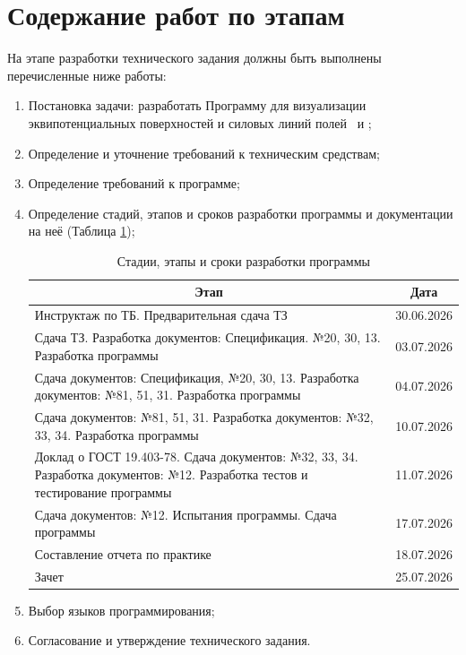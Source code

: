 \documentclass[14pt,a4paper,final]{extreport}
\begin{document}
\section{Содержание работ по этапам}
На этапе разработки технического задания должны быть выполнены перечисленные ниже
работы:
\begin{enumerate}[label=\asbuk*),ref=\asbuk*]
	\item Постановка задачи: разработать Программу для визуализации эквипотенциальных поверхностей и силовых линий полей \fieldA\ и \fieldB; 
	\item Определение и уточнение требований к техническим средствам;
	\item Определение требований к программе;
	\item Определение стадий, этапов и сроков разработки программы и документации на неё (Таблица \ref{table:stages});
	\begin{table}[h!]
	\centering
	\begin{tabular}{|p{10cm}|c|} 
		\hline
		\multicolumn{1}{|c|}{Этап} & \multicolumn{1}{c|}{Дата} \\ [0.5ex]
		\hline
		Инструктаж по ТБ. Предварительная сдача ТЗ &
		30.06.2026
	
		\\ \hline
		Сдача ТЗ. Разработка документов: Спецификация. №20, 30, 13. Разработка программы &
		03.07.2026
		
		\\ \hline
		Сдача документов: Спецификация, №20, 30, 13. Разработка документов: №81, 51, 31. Разработка программы &
		04.07.2026
		\\ \hline
		Сдача документов: №81, 51, 31. Разработка документов: №32, 33, 34. Разработка программы &
		10.07.2026

		\\ \hline
		Доклад о ГОСТ 19.403-78. Сдача документов: №32, 33, 34. Разработка документов: №12. Разработка тестов и тестирование программы &
		11.07.2026

		\\ \hline
		Сдача документов: №12. Испытания программы. Сдача программы &
		17.07.2026
		\\ \hline
		Составление отчета по практике &
		18.07.2026

		\\ \hline
		Зачет &
		25.07.2026
		
		\\ [1ex] 
		\hline
	\end{tabular}
	\caption{Стадии, этапы и сроки разработки программы}
	\label{table:stages}
\end{table}

	\item Выбор языков программирования;
	\item Согласование и утверждение технического задания.
\end{enumerate}
\end{document}
